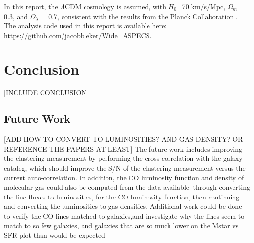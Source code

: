 \documentclass[twoside,single]{lion-msc}
\begin{document}
In this report, the $\Lambda$CDM cosmology is assumed, with $H_0$=70 km/s/Mpc, $\Omega_m$ = 0.3, and $\Omega_{\lambda}$ = 0.7, consistent with the results from the Planck Collaboration \cite{ade2016planck}. The analysis code used in this report is available \href{https://github.com/jacobbieker/Wide\_ASPECS}{here: https://github.com/jacobbieker/Wide\_ASPECS}. 





\chapter{Conclusion}

[INCLUDE CONCLUSION]

\section{Future Work}

[ADD HOW TO CONVERT TO LUMINOSITIES? AND GAS DENSITY? OR REFERENCE THE PAPERS AT LEAST]
The future work includes improving the clustering measurement by performing the cross-correlation with the galaxy catalog, which should improve the S/N of the clustering measurement versus the current auto-correlation. In addition, the CO luminosity function and density of molecular gas could also be computed from the data available, through converting the line fluxes to luminosities, for the CO luminosity function, then continuing and converting the luminosities to gas densities. Additional work could be done to verify the CO lines matched to galaxies,and investigate why the lines seem to match to so few galaxies, and galaxies that are so much lower on the Mstar vs SFR plot than would be expected. 

\appendix
%



\end{document}

